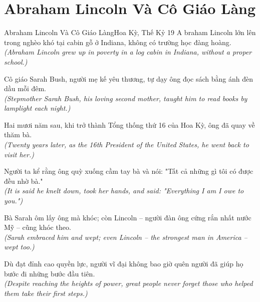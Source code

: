 \section{Abraham Lincoln Và Cô Giáo Làng}
\begin{truyen}{Abraham Lincoln Và Cô Giáo Làng}{Hoa Kỳ, Thế Kỷ 19}
A braham Lincoln lớn lên trong nghèo khó tại cabin gỗ ở Indiana, không có trường học đàng hoàng.\\
\textit{(Abraham Lincoln grew up in poverty in a log cabin in Indiana, without a proper school.)}

Cô giáo Sarah Bush, người mẹ kế yêu thương, tự dạy ông đọc sách bằng ánh đèn dầu mỗi đêm.\\
\textit{(Stepmother Sarah Bush, his loving second mother, taught him to read books by lamplight each night.)}

Hai mươi năm sau, khi trở thành Tổng thống thứ 16 của Hoa Kỳ, ông đã quay về thăm bà.\\
\textit{(Twenty years later, as the 16th President of the United States, he went back to visit her.)}

Người ta kể rằng ông quỳ xuống cầm tay bà và nói: "Tất cả những gì tôi có được đều nhờ bà."\\
\textit{(It is said he knelt down, took her hands, and said: "Everything I am I owe to you.")}

Bà Sarah ôm lấy ông mà khóc; còn Lincoln -- người đàn ông cứng rắn nhất nước Mỹ -- cũng khóc theo.\\
\textit{(Sarah embraced him and wept; even Lincoln -- the strongest man in America -- wept too.)}

\end{truyen}
\begin{baihoc}
  Dù đạt đỉnh cao quyền lực, người vĩ đại không bao giờ quên người đã giúp họ bước đi những bước đầu tiên.\\
  \textit{(Despite reaching the heights of power, great people never forget those who helped them take their first steps.)}
\end{baihoc}

